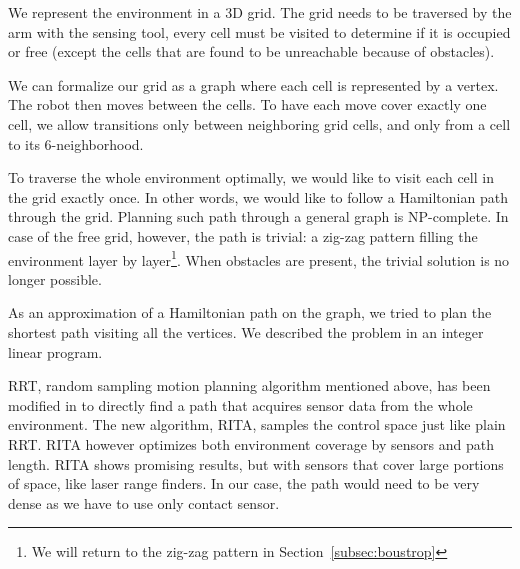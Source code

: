 \documentclass[buriama8_dp.tex]{subfiles}
\begin{document}
We represent the environment in a 3D grid. The grid needs to be traversed by the arm with the sensing tool, every cell must be visited to determine if it is occupied or free (except the cells that are found to be unreachable because of obstacles).

We can formalize our grid as a graph where each cell is represented by a vertex. The robot then moves between the cells. To have each move cover exactly one cell, we allow transitions only between neighboring grid cells, and only from a cell to its 6-neighborhood.

To traverse the whole environment optimally, we would like to visit each cell in the grid exactly once. In other words, we would like to follow a Hamiltonian path through the grid. Planning such path through a general graph is NP-complete. In case of the free grid, however, the path is trivial: a zig-zag pattern filling the environment layer by layer\footnote{We will return to the zig-zag pattern in Section~\ref{subsec:boustrop}}. When obstacles are present, the trivial solution is no longer possible.

As an approximation of a Hamiltonian path on the graph, we tried to plan the shortest path visiting all the vertices. We described the problem in an integer linear program.



RRT, random sampling motion planning algorithm mentioned above, has been modified in \cite{rita} to directly find a path that acquires sensor data from the whole environment. The new algorithm, RITA, samples the control space just like plain RRT. RITA however optimizes both environment coverage by sensors and path length. RITA shows promising results, but with sensors that cover large portions of space, like laser range finders. In our case, the path would need to be very dense as we have to use only contact sensor.
\end{document}
